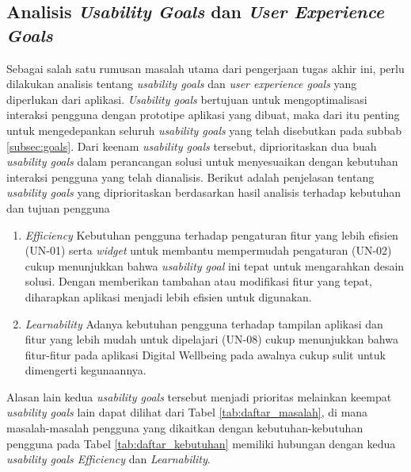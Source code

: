 
\subsection{Analisis \textit{Usability Goals} dan \textit{User Experience Goals}}
\label{subsec:analisis_goals}

Sebagai salah satu rumusan masalah utama dari pengerjaan tugas akhir ini, perlu dilakukan analisis tentang \textit{usability goals} dan \textit{user experience goals} yang diperlukan dari aplikasi. \textit{Usability goals} bertujuan untuk mengoptimalisasi interaksi pengguna dengan prototipe aplikasi yang dibuat, maka dari itu penting untuk mengedepankan seluruh \textit{usability goals} yang telah disebutkan pada subbab \ref{subsec:goals}. Dari keenam \textit{usability goals} tersebut, diprioritaskan dua buah \textit{usability goals}  dalam perancangan solusi untuk menyesuaikan dengan kebutuhan interaksi pengguna yang telah dianalisis. Berikut adalah penjelasan tentang \textit{usability goals} yang diprioritaskan berdasarkan hasil analisis terhadap kebutuhan dan tujuan pengguna

\begin{enumerate}
  \item \textit{Efficiency}
  \subitem Kebutuhan pengguna terhadap pengaturan fitur yang lebih efisien (UN-01) serta \textit{widget} untuk membantu mempermudah pengaturan (UN-02) cukup menunjukkan bahwa \textit{usability goal} ini tepat untuk mengarahkan desain solusi. Dengan memberikan tambahan atau modifikasi fitur yang tepat, diharapkan aplikasi menjadi lebih efisien untuk digunakan. 

  \item \textit{Learnability}
  \subitem Adanya kebutuhan pengguna terhadap tampilan aplikasi dan fitur yang lebih mudah untuk dipelajari (UN-08) cukup menunjukkan bahwa fitur-fitur pada aplikasi Digital Wellbeing pada awalnya cukup sulit untuk dimengerti kegunaannya.
  
\end{enumerate}

Alasan lain kedua \textit{usability goals} tersebut menjadi prioritas melainkan keempat \textit{usability goals} lain dapat dilihat dari Tabel \ref{tab:daftar_masalah}, di mana masalah-masalah pengguna yang dikaitkan dengan kebutuhan-kebutuhan pengguna pada Tabel \ref{tab:daftar_kebutuhan} memiliki hubungan dengan kedua \textit{usability goals Efficiency} dan \textit{Learnability}.


